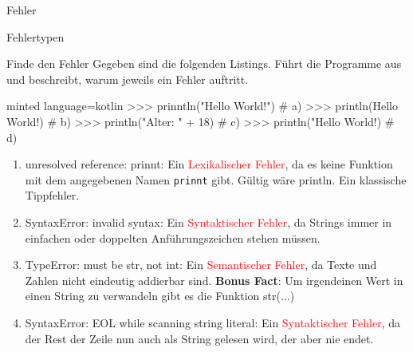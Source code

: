 \begin{task}[points=auto]{Fehler}
\begin{subtask*}[points=0]{Fehlertypen }
\begin{solution}
        \end{solution}
    \end{subtask*}
    \begin{subtask*}[points=0]{Finde den Fehler }
        Gegeben sind die folgenden Listings. Führt die Programme aus und beschreibt, warum jeweils ein Fehler auftritt.
        \begin{codeBlock}[]{minted language=kotlin}
            >>> prinntln("Hello World!") # a)
            >>> println(Hello World!)    # b)
            >>> println("Alter: " + 18)  # c)
            >>> println("Hello World!)   # d)
        \end{codeBlock}
        \begin{solution}
            \begin{enumerate}
                \item {\ttfamily unresolved reference: prinnt}: Ein \textcolor{red}{Lexikalischer Fehler}, da es keine Funktion mit dem angegebenen Namen
                    \texttt	{prinnt} gibt. Gültig wäre {\ttfamily println}. Ein klassische Tippfehler.
                \item {\ttfamily SyntaxError: invalid syntax}: Ein \textcolor{red}{Syntaktischer Fehler}, da Strings immer in einfachen oder doppelten Anführungszeichen
                    stehen müssen.
                \item {\ttfamily TypeError: must be str, not int}: Ein \textcolor{red}{Semantischer Fehler}, da Texte und Zahlen nicht eindeutig addierbar sind.
                    \textbf{Bonus Fact}: Um irgendeinen Wert in einen String zu verwandeln gibt es die Funktion {\ttfamily str(...)}
                \item {\ttfamily SyntaxError: EOL while scanning string literal}: Ein \textcolor{red}{Syntaktischer Fehler}, da der Rest der Zeile nun auch als String
                    gelesen wird, der aber nie endet.
            \end{enumerate}

        \end{solution}
    \end{subtask*}
\end{task}
